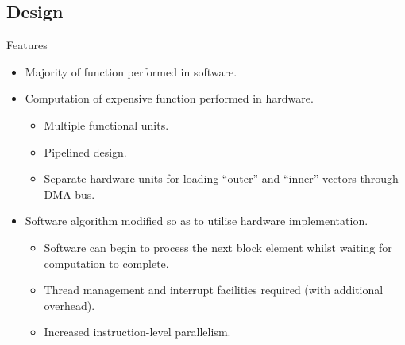 \subsection{Design}
\begin{frame}[label=design]{Features}
    \begin{itemize}
        \item Majority of  function performed
            in software.

        \item Computation of expensive  function
            performed in hardware.
        \begin{itemize}
            \item Multiple functional units.
            \item Pipelined design.
            \item Separate hardware units for loading ``outer'' and ``inner''
                vectors through DMA bus.
        \end{itemize}

        \item Software algorithm modified so as to utilise hardware
            implementation.
        \begin{itemize}
            \item Software can begin to process the next block element whilst
                waiting for  computation to complete.
            \item Thread management and interrupt facilities required (with
                additional overhead).
            \item Increased instruction-level parallelism.
        \end{itemize}
    \end{itemize}
\end{frame}

